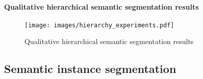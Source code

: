 \paragraph{Qualitative hierarchical semantic segmentation results}
\label{supsec:results:hierarchical-segmentation-qualitative}


\begin{figure}[!t]
\label{fig:hierarchy_experiments}
\centering
\texttt{[image: images/hierarchy\_experiments.pdf]}
\caption{Qualitative hierarchical semantic segmentation results}
\end{figure}


\subsection{Semantic instance segmentation}
\label{supsec:results:instance-segmentation}


